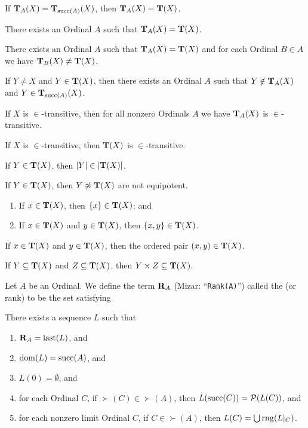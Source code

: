 \documentclass{article}
\begin{document}
\begin{thm}
\item\label{classes1:18} If $\TarskiClass[A]{X}=\TarskiClass[\succ(A)]{X}$,
  then $\TarskiClass[A]{X}=\TarskiClass{X}$.
\item\label{classes1:19} There exists an Ordinal $A$ such that
  $\TarskiClass[A]{X}=\TarskiClass{X}$.
\item\label{classes1:20} There exists an Ordinal $A$ such that
  $\TarskiClass[A]{X}=\TarskiClass{X}$ and for each Ordinal $B\in A$
  we have $\TarskiClass[B]{X}\neq\TarskiClass{X}$.
\item\label{classes1:21} If $Y\neq X$ and $Y\in\TarskiClass{X}$,
  then there exists an Ordinal $A$ such that $Y\notin\TarskiClass[A]{X}$
  and $Y\in\TarskiClass[\succ(A)]{X}$.
\item\label{classes1:22} If $X$ is $\in$-transitive,
  then for all nonzero Ordinals $A$ we have $\TarskiClass[A]{X}$ is $\in$-transitive.
\item\label{classes1:23} If $X$ is $\in$-transitive, then
  $\TarskiClass{X}$ is $\in$-transitive.
\item\label{classes1:24} If $Y\in\TarskiClass{X}$, then $\card{Y}\in\card{\TarskiClass{X}}$.
\item\label{classes1:25} If $Y\in\TarskiClass{X}$,
  then $Y\not\equipotent\TarskiClass{X}$ are not equipotent.
\item\label{classes1:26} 
  \begin{enumerate}[label=(\roman*)]
  \item If $x\in\TarskiClass{X}$, then $\{x\}\in\TarskiClass{X}$; and
  \item If $x\in\TarskiClass{X}$ and $y\in\TarskiClass{X}$, then
    $\{x,y\}\in\TarskiClass{X}$.
  \end{enumerate}
\item\label{classes1:27} If $x\in\TarskiClass{X}$ and $y\in\TarskiClass{X}$, then
  the ordered pair $(x,y)\in\TarskiClass{X}$.
\item\label{classes1:28} If $Y\subset\TarskiClass{X}$ and $Z\subset\TarskiClass{X}$,
  then $Y\times Z\subset\TarskiClass{X}$.
\end{thm}

\begin{definition}
Let $A$ be an Ordinal.
We define the term $\mathbf{R}_{A}$ (Mizar: ``\verb#Rank(A)#'') called
the  (or rank) to be the set satisfying
\begin{defn}
\item There exists a sequence $L$ such that
  \begin{enumerate}[label=(\roman*)]
  \item $\mathbf{R}_{A}=\operatorname{last}(L)$, and
  \item $\operatorname{dom}(L)=\operatorname{succ}(A)$, and
  \item $L(0)=\emptyset$, and
  \item for each Ordinal $C$, if $\succ(C)\in\succ(A)$, then $L(\operatorname{succ}(C))=\mathcal{P}(L(C))$,
    and
  \item for each nonzero limit Ordinal $C$, if $C\in\succ(A)$,
    then $L(C)=\bigcup\operatorname{rng}(L|_{C})$.
  \end{enumerate}
\end{defn}
\end{definition}
\end{document}
